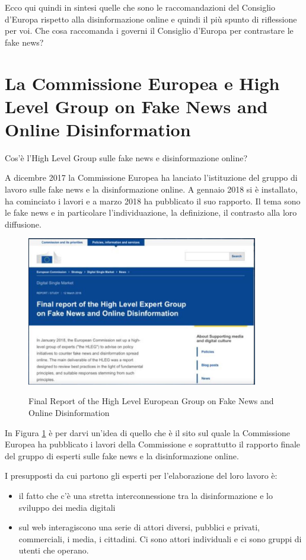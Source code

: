 Ecco qui quindi in sintesi quelle che sono le raccomandazioni del Consiglio d'Europa rispetto alla disinformazione online e quindi il più spunto di riflessione per voi. Che cosa raccomanda i governi il Consiglio d'Europa per contrastare le fake news? 

\section{La Commissione Europea e High Level Group on Fake News and Online Disinformation}
Cos'è l'High Level Group sulle fake news e disinformazione online? 

A dicembre 2017 la Commissione Europea ha lanciato l'istituzione del gruppo di lavoro sulle fake news e la disinformazione online.
A gennaio 2018 si è installato, ha cominciato i lavori e a marzo 2018 ha pubblicato il suo rapporto. 
Il tema sono le fake news e in particolare l'individuazione, la definizione, il contrasto alla loro diffusione.

\begin{figure}[h]
\centering
\includegraphics[width=0.9\textwidth]{images/11_lez_fig_02.jpg}
\label{fig: High Level European Group}
\caption{Final Report of the High Level European Group on Fake News and Online Disinformation}
\end{figure}

In Figura \ref{fig: High Level European Group} è per darvi un'idea di quello che è il sito sul quale la Commissione Europea ha pubblicato i lavori della Commissione e soprattutto il rapporto finale del gruppo di esperti sulle fake news e la disinformazione online. 

I presupposti da cui partono gli esperti per l'elaborazione del loro lavoro è:
\begin{itemize}
    \item il fatto che c'è una stretta interconnessione tra la disinformazione e lo sviluppo dei media digitali
    \item sul web interagiscono una serie di attori diversi, pubblici e privati, commerciali, i media, i cittadini. Ci sono attori individuali e ci sono gruppi di utenti che operano.
\end{itemize}

